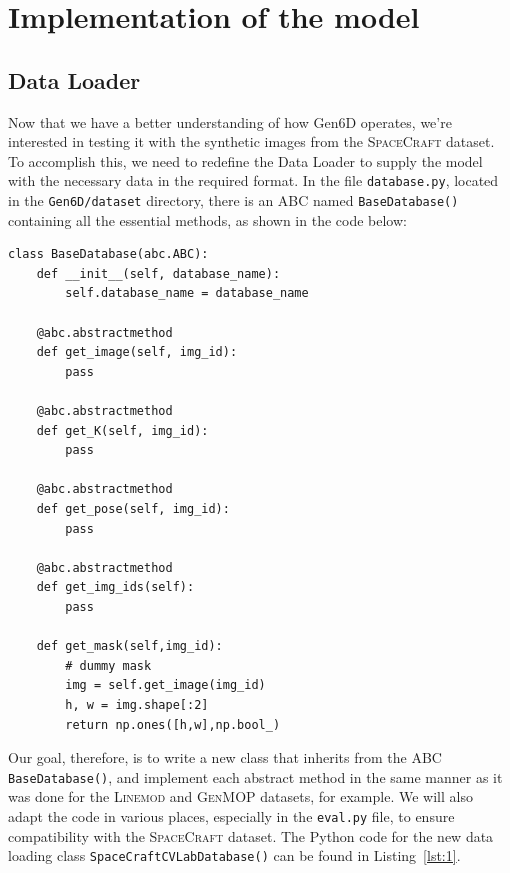 
\chapter{Implementation of the model}\label{chapter:implementation_of_the_model}

\section{Data Loader}

Now that we have a better understanding of how Gen6D operates, we're interested in testing it with the synthetic images from the \textsc{SpaceCraft} dataset. To accomplish this, we need to redefine the Data Loader to supply the model with the necessary data in the required format. In the file \texttt{database.py}, located in the \texttt{Gen6D/dataset} directory, there is an \ac{ABC} named \texttt{BaseDatabase()} containing all the essential methods, as shown in the code below:

\bigbreak

\begin{lstlisting}[style=pythonstyle, label=lst:0, caption={Python code of \ac{ABC} \texttt{BaseDatabase()}, from file \texttt{database.py}.}]
	class BaseDatabase(abc.ABC):
    def __init__(self, database_name):
        self.database_name = database_name

    @abc.abstractmethod
    def get_image(self, img_id):
        pass

    @abc.abstractmethod
    def get_K(self, img_id):
        pass

    @abc.abstractmethod
    def get_pose(self, img_id):
        pass

    @abc.abstractmethod
    def get_img_ids(self):
        pass

    def get_mask(self,img_id):
        # dummy mask
        img = self.get_image(img_id)
        h, w = img.shape[:2]
        return np.ones([h,w],np.bool_)
\end{lstlisting}

\bigbreak

Our goal, therefore, is to write a new class that inherits from the \ac{ABC} \\\texttt{BaseDatabase()}, and implement each abstract method in the same manner as it was done for the \textsc{Linemod} and \textsc{GenMOP} datasets, for example. We will also adapt the code in various places, especially in the \texttt{eval.py} file, to ensure compatibility with the \textsc{SpaceCraft} dataset. The Python code for the new data loading class \texttt{SpaceCraftCVLabDatabase()} can be found in Listing~\ref{lst:1}.

